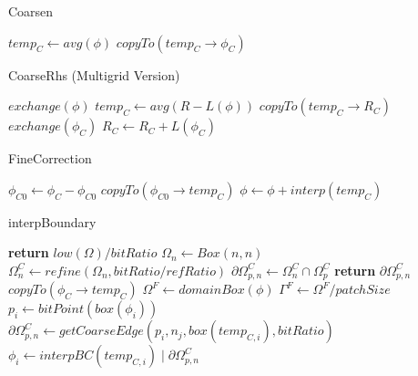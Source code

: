 \documentclass[12pt,a4paper]{article}
\begin{document}
\begin{algorithm}
\caption{Coarsen}
\begin{algorithmic}[1]
\State $temp_C \gets avg(\phi)$
\State $copyTo(temp_C\rightarrow\phi_C)$
\EndProcedure
\end{algorithmic}
\end{algorithm}

\begin{algorithm}
\caption{CoarseRhs (Multigrid Version)}
\begin{algorithmic}[1]
\State $exchange(\phi)$
\State $temp_C \gets avg(R - L(\phi))$
\State $copyTo(temp_C\rightarrow R_C)$
\State $exchange(\phi_C)$
\State $R_C \gets R_C + L(\phi_C)$
\EndProcedure
\end{algorithmic}
\end{algorithm}

\begin{algorithm}
\caption{FineCorrection}
\begin{algorithmic}[1]
\State $\phi_{C0} \gets \phi_C - \phi_{C0}$
\State $copyTo(\phi_{C0}\rightarrow temp_C)$
\State $\phi \gets \phi + interp(temp_C)$
\EndProcedure
\end{algorithmic}
\end{algorithm}

\begin{algorithm}
\caption{interpBoundary}
\begin{algorithmic}[1]
\State \textbf{return} $low(\Omega)/bitRatio$
\EndProcedure
{}
\State $\Omega_n \gets Box(n,n)$
\State $\Omega_n^C \gets refine(\Omega_n, bitRatio / refRatio)$
\State $\partial\Omega_{p,n}^C \gets \Omega_n^C \cap \Omega_p^C$
\State \textbf{return} $\partial\Omega_{p,n}^C$
\EndProcedure
{}
\State $copyTo(\phi_C \rightarrow temp_C)$
\State $\Omega^F \gets domainBox(\phi)$
\State $\Gamma^F\gets \Omega^F / patchSize$
	\State $p_i \gets bitPoint(box(\phi_i))$ 
			\State $\partial\Omega_{p,n}^C \gets getCoarseEdge(p_i, n_j,box(temp_{C,i}),bitRatio)$
			\State $\phi_i \gets interpBC(temp_{C,i}) \mid \partial\Omega_{p,n}^C$
		\EndIf
	\EndFor
\EndFor
\EndProcedure
\end{algorithmic}
\end{algorithm}
\end{document}
